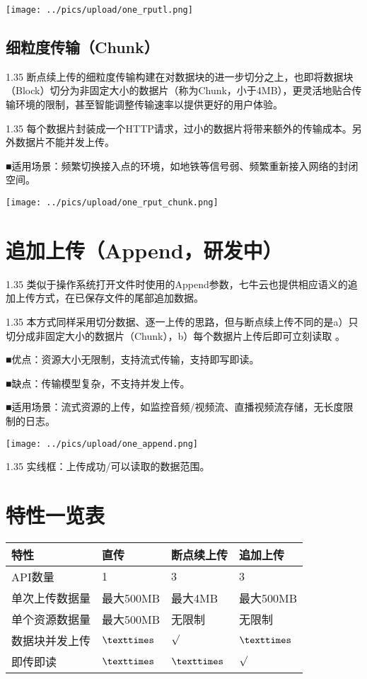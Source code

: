 \documentclass[11pt, oneside]{book}
\newcommand{\qpara}[1]{
\vspace{0.2em}
\begin{spacing}{1.35}
\noindent
#1\par
\end{spacing}
\vspace{0.2em}
}
\newcommand{\qblock}[1]{
\vspace{0.1em}
\noindent
#1\par
\vspace{0.1em}
}
\newcommand{\qtable}[1]{\footnotesize\vspace{0.5em}#1\vspace{0.5em}\normalsize}
\begin{document}
\begin{center}
\texttt{[image: ../pics/upload/one\_rputl.png]}
\end{center}

\subsection{细粒度传输（Chunk）}

\qpara{断点续上传的细粒度传输构建在对数据块的进一步切分之上，也即将数据块（Block）切分为非固定大小的数据片（称为Chunk，小于4MB），更灵活地贴合传输环境的限制，甚至智能调整传输速率以提供更好的用户体验。}
\qpara{每个数据片封装成一个HTTP请求，过小的数据片将带来额外的传输成本。另外数据片不能并发上传。}
\qblock{■\thinspace 适用场景：频繁切换接入点的环境，如地铁等信号弱、频繁重新接入网络的封闭空间。}

\begin{center}
\texttt{[image: ../pics/upload/one\_rput\_chunk.png]}
\end{center}

\section{追加上传（Append，研发中）}

\qpara{类似于操作系统打开文件时使用的Append参数，七牛云也提供相应语义的追加上传方式，在已保存文件的尾部追加数据。}
\qpara{本方式同样采用切分数据、逐一上传的思路，但与断点续上传不同的是a）只切分成非固定大小的数据片（Chunk），b）每个数据片上传后即可立刻读取 。}
\qblock{■\thinspace 优点：资源大小无限制，支持流式传输，支持即写即读。}
\qblock{■\thinspace 缺点：传输模型复杂，不支持并发上传。}
\qblock{■\thinspace 适用场景：流式资源的上传，如监控音频/视频流、直播视频流存储，无长度限制的日志。}

\begin{center}
\texttt{[image: ../pics/upload/one\_append.png]}
\end{center}

\qpara{实线框：上传成功/可以读取的数据范围。}

\section{特性一览表}

\qtable{
\def\arraystretch{2}
\begin{tabular}{|l|p{10em}|p{10em}|p{10em}|}
\hline
特性 & 直传 & 断点续上传 & 追加上传 \\
\hline
API数量 & 1 & 3 & 3 \\
\hline
单次上传数据量 & 最大500MB & 最大4MB & 最大500MB \\
\hline
单个资源数据量 & 最大500MB & 无限制 & 无限制 \\
\hline
数据块并发上传 & ${\texttimes}$ & ${\surd}$ & ${\texttimes}$ \\
\hline
即传即读 & ${\texttimes}$ & ${\texttimes}$ & ${\surd}$ \\
\hline
\end{tabular}
}
\end{document}
